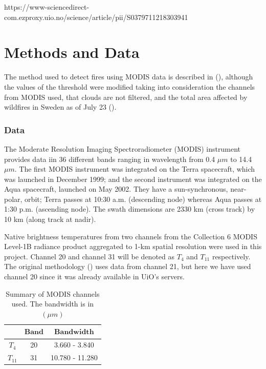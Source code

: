 \documentclass[a4paper, article, oneside, UKenglish]{memoir}
\newcommand{\0}{\mathbf{0}}
\newcommand{\1}{\mathbf{1}}
\begin{document}
https://www-sciencedirect-com.ezproxy.uio.no/science/article/pii/S0379711218303941


\chapter{Methods and Data}

The method used to detect fires using MODIS data is described in \citeauthor{giglio_et_al_2016} (\citeyear{giglio_et_al_2016}), although the values of the threshold were modified taking into consideration the channels from MODIS used, that clouds are not filtered, and the total area affected by wildfires in Sweden as of July 23 (\cite{2018_sweden_wildfires}).

\subsection{Data}
The Moderate Resolution Imaging Spectroradiometer (MODIS) instrument provides data iin 36 different bands ranging in wavelength from 0.4 $\mu m$ to 14.4 $\mu m$. The first MODIS instrument was integrated on the Terra spacecraft, which was launched in December 1999; and the second instrument was integrated on the Aqua spacecraft, launched on May 2002. They have a  sun-synchronous, near-polar, orbit; Terra passes at 10:30 a.m. (descending node) whereas Aqua passes at 1:30 p.m. (ascending node).  The swath dimensions are 2330 km (cross track) by 10 km (along track at nadir).

Native brightness temperatures from two channels from the Collection 6 MODIS Level-1B radiance product aggregated to 1-km spatial resolution were used in this project. Channel 20 and channel 31 will be denoted as $T_4$ and $T_{11}$ respectively. The original methodology (\cite{giglio_et_al_2016}) uses data from channel 21, but here we have used channel 20 since it was already available in UiO's servers.

\begin{table}[htbp]
    \centering
    \begin{tabular}{@{}ccc@{}}
        \toprule
        \(\boldsymbol{}\) & \(\boldsymbol{Band}\) & \(\boldsymbol{Bandwidth}\)
        \\
        \midrule
        $T_4$     & 20   & 3.660 - 3.840 
        \\
        $T_{11}$    & 31   & 10.780 - 11.280
        \\
        \bottomrule
    \end{tabular}
    \caption{Summary of MODIS channels used. The bandwidth is in $(\mu m)$}
    \label{tab:modis_bands}
\end{table}
\end{document}
